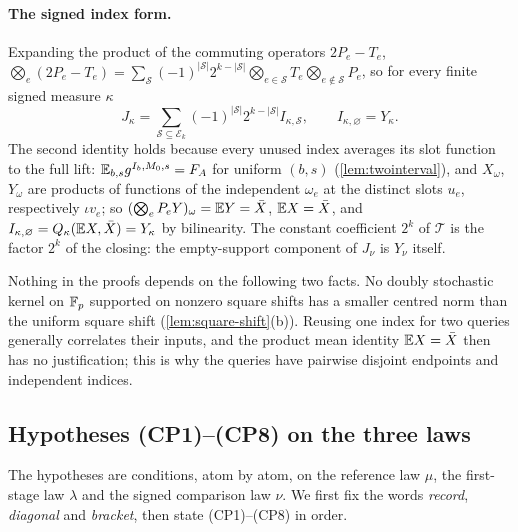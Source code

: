 \paragraph{The signed index form.}
Expanding the product of the commuting operators $2P_e-T_e$,
$\bigotimes_e(2P_e-T_e)=\sum_{\mathcal S}(-1)^{|\mathcal S|}2^{k-|\mathcal
S|}\bigotimes_{e\in\mathcal S}T_e\bigotimes_{e\notin\mathcal S}P_e$, so for
every finite signed measure $\kappa$
\begin{equation}\label{eq:record:expansion}
 J_\kappa=\sum_{\mathcal S\subseteq\mathcal E_k}
 (-1)^{|\mathcal S|}2^{k-|\mathcal S|}I_{\kappa,\mathcal S},
 \qquad I_{\kappa,\varnothing}=Y_\kappa .
\end{equation}
The second identity holds because every unused index averages its slot
function to the full lift: $\mathbb E_{b,s}g^{I_b,M_0,s}=F_A$ for uniform $(b,s)$
(\cref{lem:twointerval}), and $X_\omega$, $Y_\omega$ are products of functions
of the independent $\omega_e$ at the distinct slots $u_e$, respectively $\iota
v_e$; so $(\bigotimes_eP_eY)_\omega=\mathbb E Y=\bar X$, $\mathbb E X=\bar X$, and
$I_{\kappa,\varnothing}=Q_\kappa(\mathbb E X,\bar X)=Y_\kappa$ by bilinearity. The constant coefficient $2^k$ of
$\mathcal T$ is the factor $2^k$ of the closing: the empty-support component
of $J_\nu$ is $Y_\nu$ itself.

\begin{remark}\label{rem:hyb:optimal}
Nothing in the proofs depends on the following two facts. No doubly
stochastic kernel on $\mathbb F_p$ supported on nonzero square shifts has a smaller
centred norm than the uniform square shift (\cref{lem:square-shift}(b)). Reusing one index for
two queries generally correlates their inputs, and the product mean identity
$\mathbb E X=\bar X$ then has no justification; this is why the queries have
pairwise disjoint endpoints and independent indices.
\end{remark}

\subsection{Hypotheses (CP1)--(CP8) on the three laws}\label{subsec:cp:hypotheses}

The hypotheses are conditions, atom by atom, on the reference law
$\mu$, the first-stage law $\lambda$ and the signed comparison law
$\nu$. We first fix the words \emph{record}, \emph{diagonal} and
\emph{bracket}, then state (CP1)--(CP8) in order.

